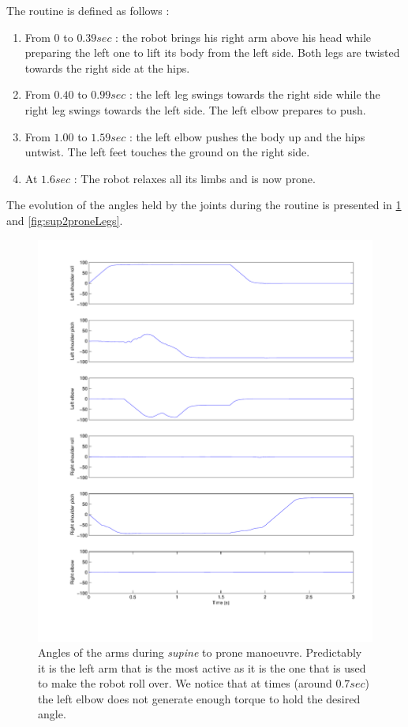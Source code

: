 The routine is defined as follows :\begin{enumerate}
\item From $0$ to $0.39sec$ : the robot brings his right arm above his head while preparing the left one to lift its body from the left side. Both legs are twisted towards the right side at the hips.

\item From $0.40$ to $0.99sec$ : the left leg swings towards the right side while the right leg swings towards the left side. The left elbow prepares to push.

\item From $1.00$ to $1.59sec$ : the left elbow pushes the body up and the hips untwist. The left feet touches the ground on the right side.

\item At $1.6sec$ : The robot relaxes all its limbs and is now prone.
\end{enumerate}

The evolution of the angles held by the joints during the routine is presented in \cref{fig:sup2proneArms} and \cref{fig:sup2proneLegs}. 

\begin{figure}[htp]
\center
    \includegraphics[width = \textwidth]{figures/sup2proneArms}
    \caption[Angles of the arms during \emph{supine} to prone manoeuvre]{Angles of the arms during \emph{supine} to prone manoeuvre. Predictably it is the left arm that is the most active as it is the one that is used to make the robot roll over. We notice that at times (around $0.7sec$) the left elbow does not generate enough torque to hold the desired angle.}
    \label{fig:sup2proneArms}
\end{figure}

